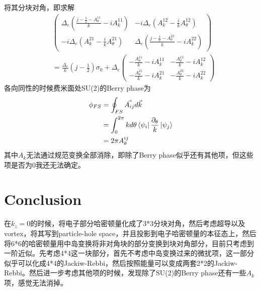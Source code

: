 \documentclass[22pt]{article}
\begin{document}
将其分块对角，即求解
\begin{align}
	&
	\begin{pmatrix}
	\Delta_e(\frac{j-\frac{1}{2}-A_{\theta}^{11}}{k}-iA_k^{11})&-i\Delta_e(A_k^{12}-\frac{i}{k}A_{\theta}^{12})\\
	-i\Delta_e(A_k^{21}-\frac{i}{k}A_{\theta}^{21})&
	\Delta_e(\frac{j-\frac{1}{2}-A_{\theta}^{22}}{k}-iA_k^{22})
	\end{pmatrix}\\
&=\frac{\Delta_e}{k}(j-\frac{1}{2})\sigma_0+\Delta_e
\begin{pmatrix}
	-\frac{A_{\theta}^{11}}{k}-iA_k^{11}&-\frac{A_{\theta}^{12}}{k}-iA_k^{12}\\
	-\frac{A_{\theta}^{21}}{k}-iA_k^{21}&-\frac{A_{\theta}^{22}}{k}-iA_k^{22}
\end{pmatrix}
\end{align}
各向同性的时候费米面处SU(2)的Berry phase为
\begin{align}
	\phi_{FS}&=\oint_{FS}\vec{A_{ij}}d\vec{k}\\
	&=\int_0^{2\pi}kd\theta \bra{\psi_i}\frac{\partial_{\theta}}{k}\ket{\psi_j}
	\\
	&=2\pi A_{\theta}^{ij}
\end{align}
其中$A_k$无法通过规范变换全部消除，即除了Berry phase似乎还有其他项，但这些项是否为0我还无法确定。
\section{Conclusion}
在$k_z=0$的时候，将电子部分哈密顿量化成了3*3分块对角，然后考虑超导以及vortex，将其写到particle-hole space，并且投影到电子哈密顿量的本征态上，然后将6*6的哈密顿量用中岛变换将非对角块的部分变换到块对角部分，目前只考虑到一阶近似。先考虑4*4这一块部分，首先不考虑中岛变换过来的微扰项，这一部分似乎可以化成4*4的Jackiw-Rebbi，然后按照能量可以变成两套2*2的Jackiw-Rebbi。然后进一步考虑其他项的时候，发现除了SU(2)的Berry phase还有一些$A_k$项，感觉无法消掉。
\end{document}
